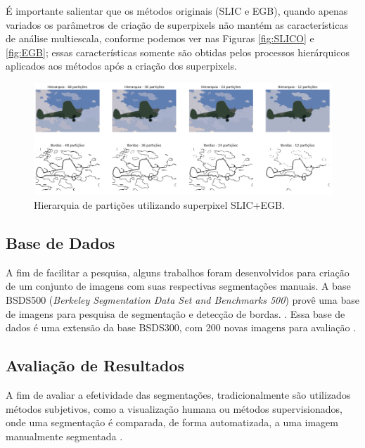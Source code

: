 \begin{document}
É importante salientar que os métodos originais (SLIC e EGB), quando apenas variados os parâmetros de criação de superpixels não mantém as características de análise multiescala, conforme podemos ver nas Figuras \ref{fig:SLICO} e \ref{fig:EGB}; essas características somente são obtidas pelos processos hierárquicos aplicados aos métodos após a criação dos superpixels.

\begin{figure}[ht]
\centering
\includegraphics[width=1.\textwidth]{slic_hierarquia_particoes.png}
\caption{Hierarquia de partições utilizando superpixel SLIC+EGB.}
\label{fig:hierarq_partit}
\end{figure}


\subsection{Base de Dados} \label{ssec:segmentacao}

A fim de facilitar a pesquisa, alguns trabalhos foram desenvolvidos para criação de um conjunto de imagens com suas respectivas segmentações manuais. A base BSDS500 (\textit{Berkeley Segmentation Data Set and Benchmarks 500}) provê uma base de imagens para pesquisa de segmentação e detecção de bordas. \cite{BSDS500}. Essa base de dados é uma extensão da base BSDS300, com 200 novas imagens para avaliação \cite{BSDS500}.


\subsection{Avaliação de Resultados} \label{ssec:aval_resultados}

A fim de avaliar a efetividade das segmentações, tradicionalmente são utilizados métodos subjetivos, como a visualização humana ou métodos supervisionados, onde uma segmentação é comparada, de forma automatizada, a uma imagem manualmente segmentada \cite{ZHANG2008}. %
\end{document}
